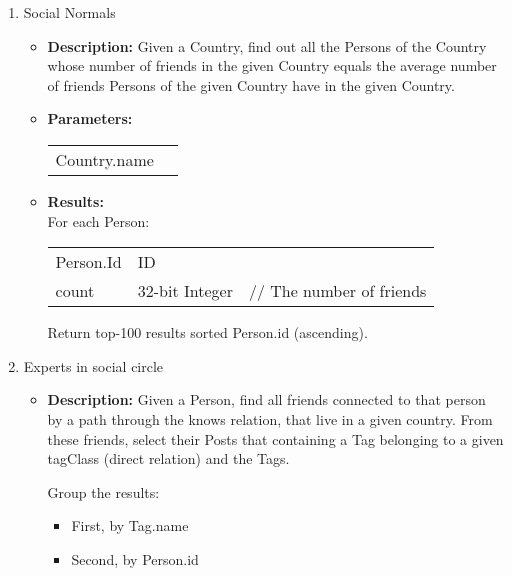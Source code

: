 {\begin{enumerate}
      \item Social Normals
            \begin{itemize}
                \item \textbf{Description:}
                  Given a Country, find out all the Persons of the Country whose number of friends in the given Country
                  equals the average number of friends Persons of the given Country have in the given Country.
                \item \textbf{Parameters:} \\
                    \begin{tabular}{ll}
                      Country.name & \\
                    \end{tabular}
                \item \textbf{Results:} \\
                   For each Person:
                    \begin{tabular}{lll}
                      Person.Id & ID & \\
                      count & 32-bit Integer & \parbox[t]{20cm}{ // The number of friends \strut} \\
                    \end{tabular}
                    Return top-100 results sorted Person.id (ascending).
                    \end{itemize}

      \item Experts in social circle
            \begin{itemize}
                \item \textbf{Description:}
                  Given a Person, find all friends connected to that person by a path through the knows relation, that
                  live in a given country. From these friends, select their Posts that containing a Tag belonging to a
                  given tagClass (direct relation) and the Tags.

                  Group the results:
                  \begin{itemize}
                      \item First, by Tag.name
                      \item Second, by Person.id
                  \end{itemize}


\end{itemize}
\end{enumerate}}
